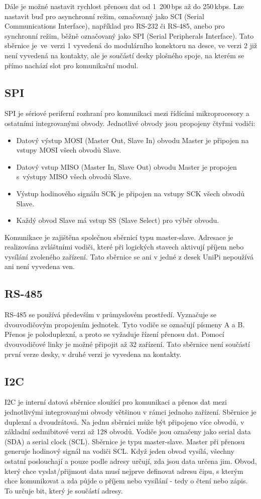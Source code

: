 Dále je možné nastavit rychlost přenosu dat od 1~200\,bps až do 250\,kbps. Lze nastavit buď pro asynchronní režim, označovaný jako SCI (Serial Communications Interface), například pro RS-232 či RS-485, anebo pro synchronní režim, běžně označovaný jako SPI (Serial Peripherals Interface). Tato sběrnice je~ve~verzi 1 vyvedená do modulárního konektoru na desce, ve verzi 2 již není vyvedená na kontakty, ale je součástí desky plošného spoje, na kterém se přímo nachází slot pro komunikační modul.


\subsection{SPI}
SPI je sériové periferní rozhraní pro komunikaci mezi řídícími mikroprocesory a ostatními integrovanými obvody. Jednotlivé obvody jsou propojeny čtyřmi vodiči:
\begin{itemize}
	\item Datový výstup MOSI (Master Out, Slave In) obvodu Master je připojen na vstupy MOSI všech obvodů Slave.
	\item Datový vstup MISO (Master In, Slave Out) obvodu Master je propojen s~výstupy MISO všech obvodů Slave.
	\item Výstup hodinového signálu SCK je připojen na vstupy SCK všech obvodů Slave.
	\item Každý obvod Slave má vstup SS (Slave Select) pro výběr obvodu.
\end{itemize}
Komunikace je zajištěna společnou sběrnicí typu master-slave. Adresace je realizována zvláštními vodiči, které při logických stavech aktivují příjem nebo vysílání zvoleného zařízení. Tato sběrnice se ani v jedné z desek UniPi nepoužívá ani není vyvedena ven.

\subsection{RS-485}
RS-485 se používá především v průmyslovém prostředí. Vyznačuje se dvouvodičovým propojením jednotek. Tyto vodiče se označují písmeny A a B. Přenos je poloduplexní, a proto se vyžaduje řízení přenosu dat. Pomocí dvouvodičové linky je možné připojit až 32 zařízení. Tato sběrnice není součástí první verze desky, v druhé verzi je vyvedena na kontakty.

\subsection{I2C}
I2C je interní datová sběrnice sloužící pro komunikaci a přenos dat mezi jednotlivými integrovanými obvody většinou v rámci jednoho zařízení. Sběrnice je duplexní a dvoudrátová. Na jednu sběrnici může být připojeno více obvodů, v základní sedmibitové verzi až 128 obvodů.
Vodiče jsou označeny jako serial data (SDA) a serial clock (SCL). Sběrnice je typu master-slave. Master při přenosu generuje hodinový signál na vodiči SCL. Když jeden obvod vysílá, všechny ostatní poslouchají a pouze podle adresy určují, zda jsou data určena jim. Obvod, který chce vyslat/přijmout data musí nejprve definovat adresu čipu, s kterým chce komunikovat a zda půjde o příjem nebo vysílání - tedy o čtení nebo zápis. To určuje bit, který je součástí adresy. 

